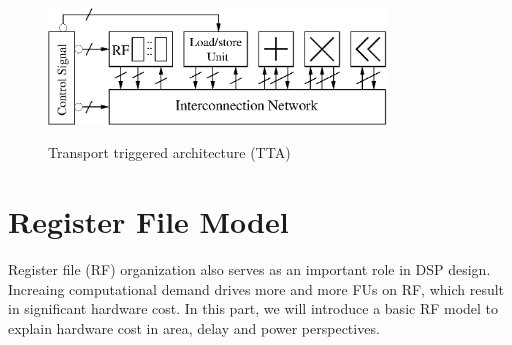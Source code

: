         \begin{figure}[!ht] 
            \caption{Transport triggered architecture (TTA)}
            \centering
            \includegraphics[width=0.8\textwidth]{./figs/tta.eps}
            \label{fig:tta}
        \end{figure}
      

    \section{Register File Model}
    Register file (RF) organization also serves as an important role in DSP design. 
    Increaing computational demand drives more and more FUs on RF,
    which result in significant hardware cost.
    In this part, we will introduce a basic RF model to explain hardware cost in area, delay and power perspectives.
